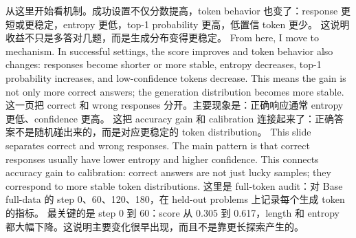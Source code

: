 {}\markdownRendererHorizontalRule{}\markdownRendererInterblockSeparator
{}\markdownRendererInterblockSeparator
{}\markdownRendererInterblockSeparator
{}从这里开始看机制。成功设置不仅分数提高，token behavior 也变了：response 更短或更稳定，entropy 更低，top-1 probability 更高，低置信 token 更少。\markdownRendererInterblockSeparator
{}这说明收益不只是多答对几题，而是生成分布变得更稳定。\markdownRendererInterblockSeparator
{}\markdownRendererInterblockSeparator
{}From here, I move to mechanism. In successful settings, the score improves and token behavior also changes: responses become shorter or more stable, entropy decreases, top-1 probability increases, and low-confidence tokens decrease.\markdownRendererInterblockSeparator
{}This means the gain is not only more correct answers; the generation distribution becomes more stable.\markdownRendererInterblockSeparator
{}\markdownRendererHorizontalRule{}\markdownRendererInterblockSeparator
{}\markdownRendererInterblockSeparator
{}\markdownRendererInterblockSeparator
{}这一页把 correct 和 wrong responses 分开。主要现象是：正确响应通常 entropy 更低、confidence 更高。\markdownRendererInterblockSeparator
{}这把 accuracy gain 和 calibration 连接起来了：正确答案不是随机碰出来的，而是对应更稳定的 token distribution。\markdownRendererInterblockSeparator
{}\markdownRendererInterblockSeparator
{}This slide separates correct and wrong responses. The main pattern is that correct responses usually have lower entropy and higher confidence.\markdownRendererInterblockSeparator
{}This connects accuracy gain to calibration: correct answers are not just lucky samples; they correspond to more stable token distributions.\markdownRendererInterblockSeparator
{}\markdownRendererHorizontalRule{}\markdownRendererInterblockSeparator
{}\markdownRendererInterblockSeparator
{}\markdownRendererInterblockSeparator
{}这里是 full-token audit：对 Base full-data 的 step 0、60、120、180，在 held-out problems 上记录每个生成 token 的指标。\markdownRendererInterblockSeparator
{}最关键的是 step 0 到 60：score 从 0.305 到 0.617，length 和 entropy 都大幅下降。这说明主要变化很早出现，而且不是靠更长探索产生的。\markdownRendererInterblockSeparator
